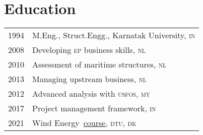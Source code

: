 \section*{Education} %
\label{sec:edu}

\begin{tabular}{l l}
  1994 & M.Eng., Struct.Engg., Karnatak University, \textsc{in} \\
  2008 & Developing \textsc{ep} business skills, \textsc{nl} \\
  2010 & Assessment of maritime structures, \textsc{nl} \\
  2013 & Managing upstream business, \textsc{nl} \\
  2012 & Advanced analysis with \textsc{usfos}, \textsc{my} \\
  2017 & Project management framework, \textsc{in} \\
  2021 & Wind Energy~\href{https://www.coursera.org/account/accomplishments/certificate/Y9CRZSXUSTWB}{course}, \textsc{dtu}, \textsc{dk} \\
\end{tabular}

